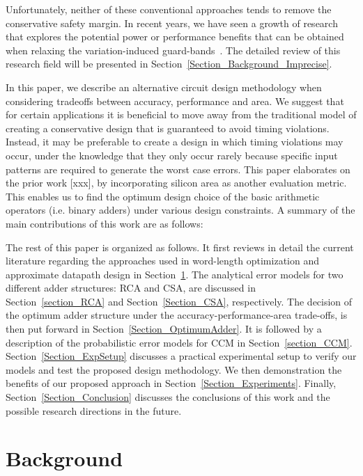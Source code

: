 \documentclass[prodmode,acmtrets]{acmsmall} %
\begin{document}
Unfortunately, neither of these conventional approaches tends to remove the conservative safety margin. In recent years, we have seen a growth of research that explores the potential power or performance benefits that can be obtained when relaxing the variation-induced guard-bands~\cite{NewBox2004}. The detailed review of this research field will be presented in Section~\ref{Section_Background_Imprecise}.

In this paper, we describe an alternative circuit design methodology when considering tradeoffs between accuracy, performance and area. We suggest that for certain applications it is beneficial to move away from the traditional model of creating a conservative design that is guaranteed to avoid timing violations. Instead, it may be preferable to create a design in which timing violations may occur, under the knowledge that they only occur rarely because specific input patterns are required to generate the worst case errors. This paper elaborates on the prior work [xxx], by incorporating silicon area as another evaluation metric. This enables us to find the optimum design choice of the basic arithmetic operators (i.e. binary adders) under various design constraints. A summary of the main contributions of this work are as follows:

The rest of this paper is organized as follows. It first reviews in detail the current literature regarding the approaches used in word-length optimization and approximate datapath design in Section~\ref{Section_Background}. The analytical error models for two different adder structures: RCA and CSA, are discussed in Section~\ref{section_RCA} and Section~\ref{Section_CSA}, respectively. The decision of the optimum adder structure under the accuracy-performance-area trade-offs, is then put forward in Section~\ref{Section_OptimumAdder}. It is followed by a description of the probabilistic error models for CCM in Section~\ref{section_CCM}. Section~\ref{Section_ExpSetup} discusses a practical experimental setup to verify our models and test the proposed design methodology. We then demonstration the benefits of our proposed approach in Section~\ref{Section_Experiments}. Finally, Section~\ref{Section_Conclusion} discusses the conclusions of this work and the possible research directions in the future.

\section{Background}\label{Section_Background}
\end{document}
